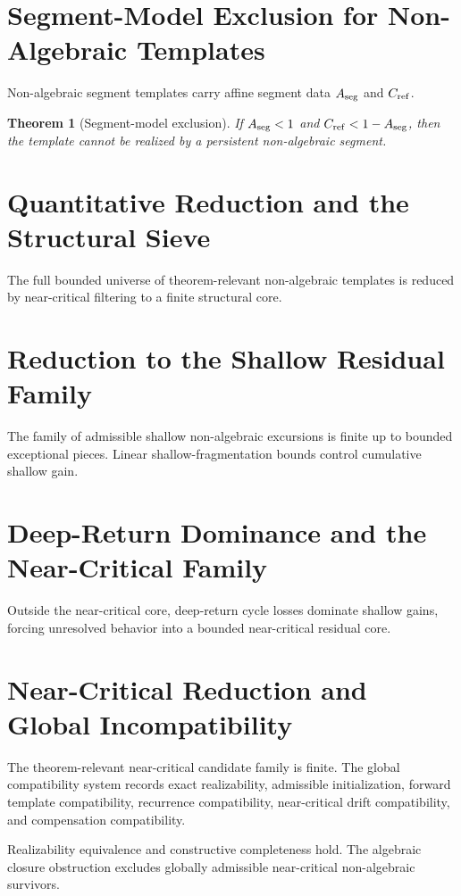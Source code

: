 \documentclass[11pt,a4paper]{article}
\newtheorem{theorem}{Theorem}
\begin{document}
\section{Segment-Model Exclusion for Non-Algebraic Templates}
Non-algebraic segment templates carry affine segment data \(A_{\rm seg}\) and \(C_{\rm ref}\).

\begin{theorem}[Segment-model exclusion]
If \(A_{\rm seg} < 1\) and \(C_{\rm ref} < 1 - A_{\rm seg}\), then the template cannot be realized by a persistent non-algebraic segment.
\end{theorem}

\section{Quantitative Reduction and the Structural Sieve}
The full bounded universe of theorem-relevant non-algebraic templates is reduced by near-critical filtering to a finite structural core.

\section{Reduction to the Shallow Residual Family}
The family of admissible shallow non-algebraic excursions is finite up to bounded exceptional pieces. Linear shallow-fragmentation bounds control cumulative shallow gain.

\section{Deep-Return Dominance and the Near-Critical Family}
Outside the near-critical core, deep-return cycle losses dominate shallow gains, forcing unresolved behavior into a bounded near-critical residual core.

\section{Near-Critical Reduction and Global Incompatibility}
The theorem-relevant near-critical candidate family is finite. The global compatibility system records exact realizability, admissible initialization, forward template compatibility, recurrence compatibility, near-critical drift compatibility, and compensation compatibility.

Realizability equivalence and constructive completeness hold. The algebraic closure obstruction excludes globally admissible near-critical non-algebraic survivors.
\end{document}
